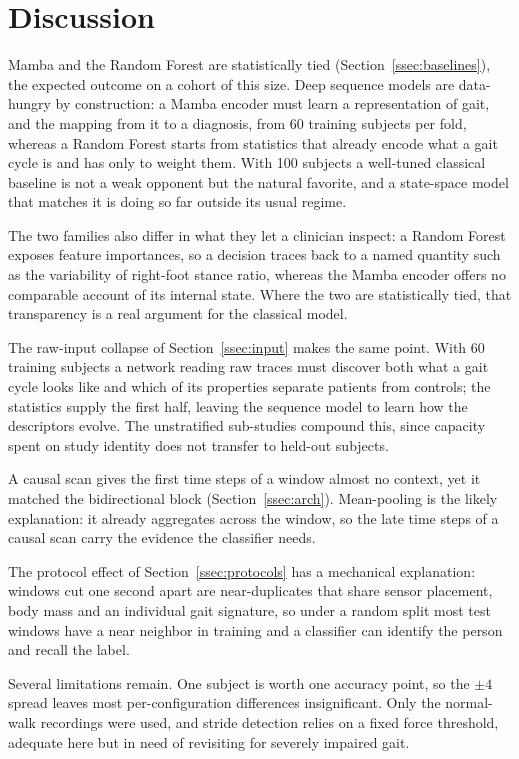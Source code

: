 \section{Discussion}
\label{sec:disc}

Mamba and the Random Forest are statistically tied
(Section~\ref{ssec:baselines}), the expected outcome on a cohort of this size.
Deep sequence models are data-hungry by construction: a Mamba encoder
must learn a representation of gait, and the mapping from it to a diagnosis,
from 60 training subjects per fold, whereas a Random Forest starts from
statistics that already encode what a gait cycle is and has only to weight
them. With 100 subjects a well-tuned classical baseline is not a weak opponent
but the natural favorite, and a state-space model that matches it is doing so
far outside its usual regime.

The two families also differ in what they let a clinician inspect: a Random
Forest exposes feature importances, so a decision traces back to a named
quantity such as the variability of right-foot stance ratio, whereas the Mamba
encoder offers no comparable account of its internal state. Where the two are
statistically tied, that transparency is a real argument for the classical
model.


The raw-input collapse of Section~\ref{ssec:input} makes the same point. With 60 training subjects a network
reading raw traces must discover both what a gait cycle looks like and which of
its properties separate patients from controls; the statistics supply the first
half, leaving the sequence model to learn how the descriptors evolve. The
unstratified sub-studies compound this, since capacity spent on study identity
does not transfer to held-out subjects.

A causal scan gives the first time steps of a window almost no context, yet it
matched the bidirectional block (Section~\ref{ssec:arch}).
Mean-pooling is the likely explanation: it already aggregates
across the window, so the late time steps of a causal scan carry the evidence the
classifier needs.

The protocol effect of Section~\ref{ssec:protocols} has a mechanical
explanation: windows cut one second apart are near-duplicates that share sensor
placement, body mass and an individual gait signature, so under a random split
most test windows have a near neighbor in training and a classifier can
identify the person and recall the label.

Several limitations remain. One subject is
worth one accuracy point, so the $\pm 4$ spread leaves most per-configuration
differences insignificant. Only the normal-walk recordings were used, and
stride detection relies on a fixed force threshold, adequate here but in need
of revisiting for severely impaired gait.
